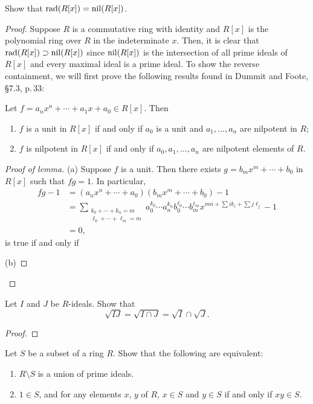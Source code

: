 \begin{problem}
Show that $\mathrm{rad}(R[x])=\mathrm{nil}(R[x])$.
\end{problem}
\begin{proof}
Suppose $R$ is a commutative ring with identity and $R[x]$ is the
polynomial ring over $R$ in the indeterminate $x$. Then, it is
clear that $\mathrm{rad}(R[x])\supset\mathrm{nil}(R[x])$ since $\mathrm{nil}(R[x])$ is
the intersection of all prime ideals of $R[x]$ and every maximal
ideal is a prime ideal. To show the reverse containment, we will
first prove the following results found in Dummit and Foote,
\S7.3, p.\,33:
\begin{lemma}
Let $f=a_nx^n+\cdots+a_1x+a_0\in R[x]$. Then
\begin{enumerate}[noitemsep,label=(\alph*)]
\item $f$ is a unit in $R[x]$ if and only if $a_0$ is a unit and
  $a_1,...,a_n$ are nilpotent in $R$;
\item $f$ is nilpotent in $R[x]$ if and only if $a_0,a_1,...,a_n$
  are nilpotent elements of $R$.
\end{enumerate}
\end{lemma}
\begin{proof}[Proof of lemma]
\renewcommand\qedsymbol{$\vardiamondsuit$}
(a) Suppose $f$ is a unit. Then there exists
$g=b_mx^m+\cdots+b_0$ in $R[x]$ such that $fg=1$. In particular,
\begin{align*}
fg-1
&=\left(a_nx^n+\cdots+a_0\right)\left(b_mx^m+\cdots+b_0\right)-1\\
&=\sum_{\substack{k_0+\cdots+k_n=m\\\ell_0+\cdots+\ell_m=m}}
  a_0^{k_0}\cdots a_{n}^{k_n}
  b_0^{\ell_0}\cdots b_m^{\ell_m}
  x^{mn+\sum ik_i+\sum j\ell_j}
  -1\\
&=0,
\end{align*}
is true if and only if

(b)
\end{proof}
\end{proof}
\newpage
\begin{problem}
Let $I$ and $J$ be $R$-ideals. Show that
\[\sqrt{IJ}=\sqrt{I\cap J}=\sqrt{I}\cap\sqrt{J}.\]
\end{problem}
\begin{proof}

\end{proof}
\newpage
\begin{problem}
Let $S$ be a subset of a ring $R$. Show that the following are
equivalent:
\begin{enumerate}[noitemsep,label=(\roman*)]
\item $R\setminus S$ is a union of prime ideals.
\item $1\in S$, and for any elements $x$, $y$ of $R$, $x\in S$
  and $y\in S$ if and only if $xy\in S$.
\end{enumerate}
\end{problem}

